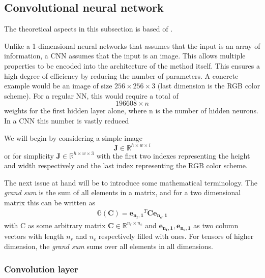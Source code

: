 \documentclass[%
 uio,
 jmp,
 amsmath,amssymb,
 reprint, nofootinbib]{revtex4-1}
\numberwithin{equation}{section}
\begin{document}
\subsection{Convolutional neural network}

The theoretical aspects in this subsection is based of \cite{CS231}.

Unlike a 1-dimensional neural networks that assumes that the input is an array of information, a CNN assumes that the input is an image. This allows multiple properties to be encoded into the architecture of the method itself. This ensures a high degree of efficiency by reducing the number of parameters. A concrete example would be an image of size \(256\times 256\times 3\) (last dimension is the RGB color scheme). For a regular NN, this would require a total of
\begin{equation}
196608\times n
\end{equation}
weights for the first hidden layer alone, where n is the number of hidden neurons. In a CNN this number is vastly reduced

We will begin by considering a simple image
\begin{equation}\label{eq:03}
\bm{J} \in \mathbb{R}^{h\times w\times i}
\end{equation}
or for simplicity \(\bm{J} \in \mathbb{R}^{h\times w\times 3}\) with the first two indexes representing the height and width respectively and the last index representing the RGB color scheme.

The next issue at hand will be to introduce some mathematical terminology. The \textit{grand sum} is the sum of all elements in a matrix, and for a two dimensional matrix this can be written as
\begin{align}
\mathbb{G}(\bm{C}) = \bm{e_{n_r,1}}^T\bm{C}\bm{e_{n_c,1}}
\end{align}
with C as some arbitrary matrix \(\bm{C} \in \mathbb{R}^{n_r\times n_c}\) and \(\bm{e_{n_r,1}}, \bm{e_{n_c,1}}\) as two column vectors with length \(n_r\) and \(n_c\) respectively filled with ones. For tensors of higher dimension, the \textit{grand sum} sums over all elements in all dimensions.

\subsubsection{Convolution layer}
\end{document}
